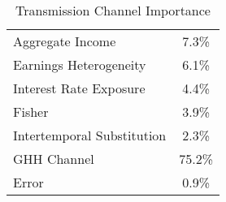     \begin{table}  
\begin{center} 
\caption{Transmission Channel Importance}\label{table:trans_channel}\begin{tabular}{lc}  
\toprule 
Aggregate Income & 7.3\% 
\\ Earnings Heterogeneity & 6.1\% 
\\ Interest Rate Exposure & 4.4\% 
\\ Fisher & 3.9\% 
\\ Intertemporal Substitution & 2.3\% 
\\ GHH Channel & 75.2\% 
\\ Error & 0.9\% 
\\ \bottomrule  
 \end{tabular}   
\end{center} 
\end{table}  
